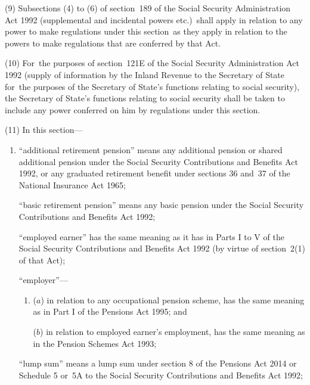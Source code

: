 \documentclass[12pt,a4paper]{article}
\begin{document}
(9) Subsections (4)  to (6)  of section~189 of the Social Security Administration Act 1992 (supplemental and incidental powers etc.)\ shall apply in relation to any power to make regulations under this section~as they apply in relation to the powers to make regulations that are conferred by that Act.

(10) For~the purposes of section~121E of the Social Security Administration Act 1992 (supply of information by the Inland Revenue to the Secretary of State for~the purposes of the Secretary of State’s functions relating to social security), the Secretary of State’s functions relating to social security shall be taken to include any power conferred on him by regulations under this section.

(11) In this section—
\begin{enumerate}\item[]

“additional retirement pension” means any additional pension or shared additional pension under the Social Security Contributions and Benefits Act 1992, or any graduated retirement benefit under sections 36 and~37 of the National Insurance Act 1965;

“basic retirement pension” means any basic pension under the Social Security Contributions and Benefits Act 1992;


    “employed earner” has the same meaning as it has in Parts I to V of the Social Security Contributions and Benefits Act 1992 (by virtue of section~2(1)  of that Act);

    “employer”—
\begin{enumerate}\item[]
    ($a$) 
    in relation to any occupational pension scheme, has the same meaning as in Part I of the Pensions Act 1995; and

    ($b$) 
    in relation to employed earner’s employment, has the same meaning as in the Pension Schemes Act 1993;
\end{enumerate}

“lump sum” means a lump sum under 
section 8 of the Pensions Act 2014 or   %
Schedule 5 or~5A to the Social Security Contributions and Benefits Act 1992;


\end{enumerate}
\end{document}

